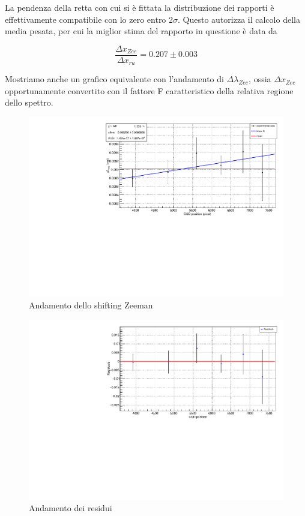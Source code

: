 \documentclass{article}
\begin{document}
	La pendenza della retta con cui si è fittata la distribuzione dei rapporti è effettivamente
	compatibile con lo zero entro 2$\sigma$. Questo autorizza il calcolo della media pesata, per cui 
	la miglior stima del rapporto in questione è data da 

	\[
		\frac{\Delta x_{Zee}}{\Delta x_{ru}} = 0.207 \pm 0.003	
	\]

	Mostriamo anche un grafico equivalente con l'andamento di $\Delta\lambda_{Zee}$, ossia 
	$\Delta x_{Zee}$ opportunamente convertito con il fattore F caratteristico della relativa regione
	dello spettro.

	\begin{center}
		\begin{figure}[H]
			\centering
			\includegraphics[scale=0.38, angle=0]{campomin/dlambdazee.pdf}
			\caption{Andamento dello shifting Zeeman}
			\label{fig:fit_dlambdazee_min}
		\end{figure}
	\end{center}

	\begin{center}
		\begin{figure}[H]
			\centering
			\includegraphics[scale=0.38, angle=0]{campomin/residuals.pdf}
			\caption{Andamento dei residui}
			\label{fig:fit_dlambdazee_min_res}
		\end{figure}
	\end{center}
\end{document}
